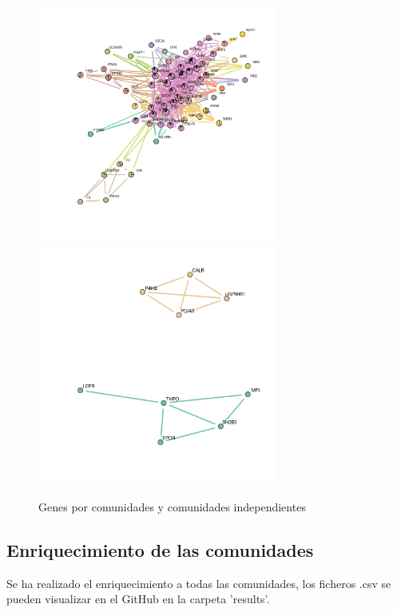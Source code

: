 \begin{figure}[h]
	\centering
	\includegraphics[width=0.70\textwidth]{figures/01_NetworkComunidades.png}
	\includegraphics[width=0.70\textwidth]{figures/05_Comunidades_Independientes.png}
	\caption{Genes por comunidades y comunidades independientes}
	\label{fig: Figura 6}
\end{figure}

\subsection{Enriquecimiento de las comunidades}
Se ha realizado el enriquecimiento a todas las comunidades, los ficheros .csv se pueden visualizar en el GitHub en la carpeta 'results'.

